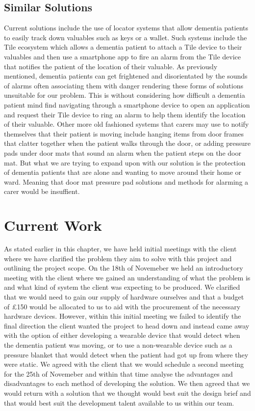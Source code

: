     \subsection{Similar Solutions}
        Current solutions include the use of locator systems that allow dementia patients to easily track down valuables such as keys or a wallet. Such systems include the Tile ecosystem which allows a dementia patient to attach a Tile device to their valuables and then use a smartphone app to fire an alarm from the Tile device that notifies the patient of the location of their valuable. As previously mentioned, dementia patients can get frightened and disorientated by the sounds of alarms often associating them with danger rendering these forms of solutions unsuitable for our problem. This is without considering how difficult a dementia patient mind find navigating through a smartphone device to open an application and request their Tile device to ring an alarm to help them identify the location of their valuable. Other more old fashioned systems that carers may use to notify themselves that their patient is moving include hanging items from door frames that clatter together when the patient walks through the door, or adding pressure pads under door mats that sound an alarm when the patient steps on the door mat. But what we are trying to expand upon with our solution is the protection of dementia patients that are alone and wanting to move around their home or ward. Meaning that door mat pressure pad solutions and methods for alarming a carer would be insuffient.

\section{Current Work}
    As stated earlier in this chapter, we have held initial meetings with the client where we have clarified the problem they aim to solve with this project and outlining the project scope. On the 18th of Novemeber we held an introductory meeting with the client where we gained an understanding of what the problem is and what kind of system the client was expecting to be produced. We clarified that we would need to gain our supply of hardware ourselves and that a budget of £150 would be allocated to us to aid with the procurement of the necessary hardware devices. However, within this initial meeting we failed to identify the final direction the client wanted the project to head down and instead came away with the option of either developing a wearable device that would detect when the dementia patient was moving, or to use a non-wearable device such as a pressure blanket that would detect when the patient had got up from where they were static. We agreed with the client that we would schedule a second meeting for the 25th of Novemeber and within that time analyse the advantages and disadvantages to each method of developing the solution. We then agreed that we would return with a solution that we thought would best suit the design brief and that would best suit the development talent available to us within our team.

